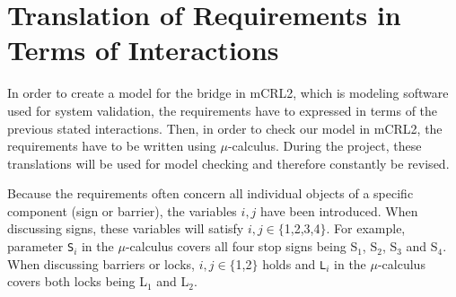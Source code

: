 \section{Translation of Requirements in Terms of Interactions}
\label{sec:trans}

In order to create a model for the bridge in mCRL2, which is modeling software used for system validation, the requirements have to expressed in terms of the previous stated interactions. Then, in order to check our model in mCRL2, the requirements have to be written using $\mu$-calculus. During the project, these translations will be used for model checking and therefore constantly be revised.

Because the requirements often concern all individual objects of a specific component (sign or barrier), the variables $i, j$ have been introduced. When discussing signs, these variables will satisfy $i,j \in \{$1,2,3,4$\}$. For example, parameter \texttt{S$_i$} in the $\mu$-calculus covers all four stop signs being S$_1$, S$_2$, S$_3$ and S$_4$. When discussing barriers or locks, $i,j \in \{$1,2$\}$ holds and \texttt{L$_i$} in the $\mu$-calculus covers both locks being L$_1$ and L$_2$.
%
